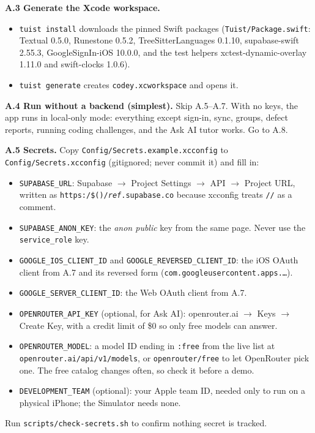 \documentclass[12pt,letterpaper]{article}
\begin{document}
\textbf{A.3 Generate the Xcode workspace.}
\begin{itemize}
  \item \texttt{tuist install} downloads the pinned Swift packages
        (\texttt{Tuist/Package.swift}: Textual 0.5.0, Runestone 0.5.2,
        TreeSitterLanguages 0.1.10, supabase-swift 2.55.3, GoogleSignIn-iOS 10.0.0, and the
        test helpers xctest-dynamic-overlay 1.11.0 and swift-clocks 1.0.6).
  \item \texttt{tuist generate} creates \texttt{codey.xcworkspace} and opens it.
\end{itemize}

\textbf{A.4 Run without a backend (simplest).} Skip A.5--A.7. With no keys, the app
runs in local-only mode: everything except sign-in, sync, groups, defect reports,
running coding challenges, and the Ask AI tutor works. Go to A.8.

\textbf{A.5 Secrets.} Copy \texttt{Config/Secrets.example.xcconfig} to
\texttt{Config/Secrets.xcconfig} (gitignored; never commit it) and fill in:
\begin{itemize}
  \item \texttt{SUPABASE\_URL}: Supabase $\to$ Project Settings $\to$ API $\to$ Project
        URL, written as \texttt{https:/\$()/\textit{ref}.supabase.co} because xcconfig
        treats \texttt{//} as a comment.
  \item \texttt{SUPABASE\_ANON\_KEY}: the \emph{anon public} key from the same page.
        Never use the \texttt{service\_role} key.
  \item \texttt{GOOGLE\_IOS\_CLIENT\_ID} and \texttt{GOOGLE\_REVERSED\_CLIENT\_ID}: the
        iOS OAuth client from A.7 and its reversed form
        (\texttt{com.googleusercontent.apps.\ldots}).
  \item \texttt{GOOGLE\_SERVER\_CLIENT\_ID}: the Web OAuth client from A.7.
  \item \texttt{OPENROUTER\_API\_KEY} (optional, for Ask AI): openrouter.ai $\to$ Keys
        $\to$ Create Key, with a credit limit of \$0 so only free models can answer.
  \item \texttt{OPENROUTER\_MODEL}: a model ID ending in \texttt{:free} from the live
        list at \texttt{openrouter.ai/api/v1/models}, or \texttt{openrouter/free} to
        let OpenRouter pick one. The free catalog changes often, so check it before a
        demo.
  \item \texttt{DEVELOPMENT\_TEAM} (optional): your Apple team ID, needed only to run
        on a physical iPhone; the Simulator needs none.
\end{itemize}
Run \texttt{scripts/check-secrets.sh} to confirm nothing secret is tracked.
\end{document}
